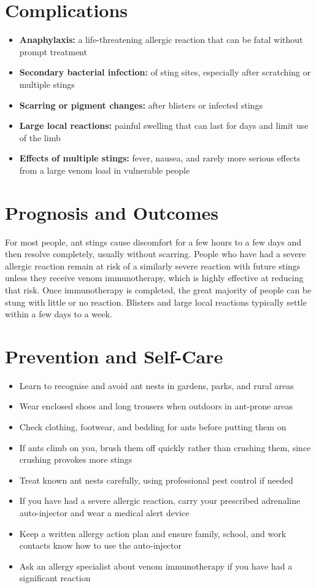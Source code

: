 \section*{Complications}
\begin{itemize}
    \item \textbf{Anaphylaxis:} a life-threatening allergic reaction that can be fatal without prompt treatment
    \item \textbf{Secondary bacterial infection:} of sting sites, especially after scratching or multiple stings
    \item \textbf{Scarring or pigment changes:} after blisters or infected stings
    \item \textbf{Large local reactions:} painful swelling that can last for days and limit use of the limb
    \item \textbf{Effects of multiple stings:} fever, nausea, and rarely more serious effects from a large venom load in vulnerable people
\end{itemize}

\section*{Prognosis and Outcomes}
For most people, ant stings cause discomfort for a few hours to a few days and then resolve completely, usually without scarring. People who have had a severe allergic reaction remain at risk of a similarly severe reaction with future stings unless they receive venom immunotherapy, which is highly effective at reducing that risk. Once immunotherapy is completed, the great majority of people can be stung with little or no reaction. Blisters and large local reactions typically settle within a few days to a week.

\section*{Prevention and Self-Care}
\begin{itemize}
    \item Learn to recognise and avoid ant nests in gardens, parks, and rural areas
    \item Wear enclosed shoes and long trousers when outdoors in ant-prone areas
    \item Check clothing, footwear, and bedding for ants before putting them on
    \item If ants climb on you, brush them off quickly rather than crushing them, since crushing provokes more stings
    \item Treat known ant nests carefully, using professional pest control if needed
    \item If you have had a severe allergic reaction, carry your prescribed adrenaline auto-injector and wear a medical alert device
    \item Keep a written allergy action plan and ensure family, school, and work contacts know how to use the auto-injector
    \item Ask an allergy specialist about venom immunotherapy if you have had a significant reaction
\end{itemize}

